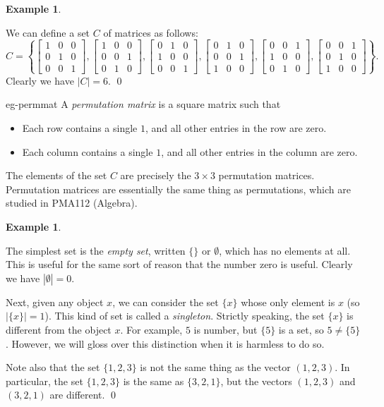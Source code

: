 \documentclass[a4paper]{book}
\newcommand{\PURPLE}[1]{{\color{purple}#1}}
\newcommand{\bsm}       {\left[\begin{smallmatrix}}
\newcommand{\esm}       {\end{smallmatrix}\right]}
\newcommand{\tm}        {\times}
\renewcommand{\:}{\colon}
\newcommand{\PMA}[1]{PMA#1}
\newcommand{\bilabel}[1]{\hypertarget{#1}{\label{#1}}}
\newcommand{\DEFN}[1]{\PURPLE{\emph{#1}}}
\theoremstyle{definition}
\newtheorem{example}[theorem]{Example}
\begin{document}
\begin{example}\bilabel{eg-permmat}
 We can define a set $C$ of matrices as follows:
 \[ C = \left\{
         \bsm 1&0&0 \\ 0&1&0 \\ 0&0&1 \esm,
         \bsm 1&0&0 \\ 0&0&1 \\ 0&1&0 \esm,
         \bsm 0&1&0 \\ 1&0&0 \\ 0&0&1 \esm,
         \bsm 0&1&0 \\ 0&0&1 \\ 1&0&0 \esm,
         \bsm 0&0&1 \\ 1&0&0 \\ 0&1&0 \esm,
         \bsm 0&0&1 \\ 0&1&0 \\ 1&0&0 \esm
        \right\}.
 \]
 Clearly we have $|C|=6$. \qed
\end{example}
\begin{background}{eg-permmat}
 A \DEFN{permutation matrix} is a square matrix such that
 \begin{itemize}
  \item Each row contains a single $1$, and all other entries in the
   row are zero.
  \item Each column contains a single $1$, and all other entries in
   the column are zero.
 \end{itemize}
 The elements of the set $C$ are precisely the $3\tm 3$ permutation
 matrices.  Permutation matrices are essentially the same thing as
 permutations, which are studied in \PMA{112} (Algebra).
\end{background}

\begin{example}\bilabel{eg-emptyset}
 The simplest set is the \DEFN{empty set}, written $\{\}$ or
 $\emptyset$, which has no elements at all.  This is useful for the
 same sort of reason that the number zero is useful.  Clearly we have
 $|\emptyset|=0$.
 
 Next, given any object $x$, we can consider the set $\{x\}$ whose
 only element is $x$ (so $|\{x\}|=1$).  This kind of set is called a
 \DEFN{singleton}.  Strictly speaking, the set $\{x\}$ is different
 from the object $x$.  For example, $5$ is number, but $\{5\}$ is a
 set, so $5\neq\{5\}$.  However, we will gloss over this distinction
 when it is harmless to do so.

 Note also that the set $\{1,2,3\}$ is not the same thing as the
 vector $(1,2,3)$.  In particular, the set $\{1,2,3\}$ is the same as
 $\{3,2,1\}$, but the vectors $(1,2,3)$ and $(3,2,1)$ are different.
 \qed
\end{example}
\end{document}
